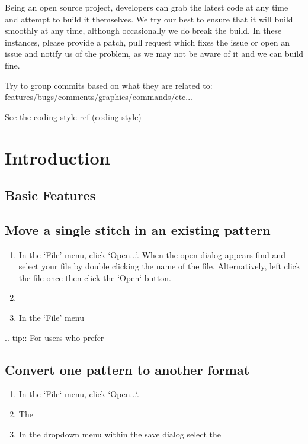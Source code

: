 \documentclass[10pt]{report}
\begin{document}
Being an open source project, developers can grab the latest code at any time
and attempt to build it themselves. We try our best to ensure that it will build smoothly
at any time, although occasionally we do break the build. In these instances,
please provide a patch, pull request which fixes the issue or open an issue and
notify us of the problem, as we may not be aware of it and we can build fine.

Try to group commits based on what they are related to: features/bugs/comments/graphics/commands/etc...

See the coding style ref (coding-style)

\section{Introduction}

\subsection{Basic Features}

\subsection{Move a single stitch in an existing pattern}

\begin{enumerate}
\item In the `File' menu, click `Open...'. When the open dialog appears find
 and select your file by double clicking the name of the file. Alternatively,
 left click the file once then click the `Open` button.
\item
\item In the `File' menu
\end{enumerate}

.. tip::
   For users who prefer

\subsection{Convert one pattern to another format}

\begin{enumerate}
\item In the `File` menu, click `Open...`.
\item The 
\item In the dropdown menu within the save dialog select the 
\end{enumerate}
\end{document}
